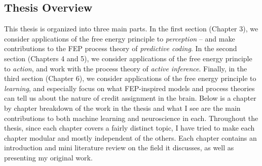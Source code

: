 \subsection{Thesis Overview}

This thesis is organized into three main parts. In the first section (Chapter 3), we consider applications of the free energy principle to \emph{perception} -- and make contributions to the FEP process theory of \emph{predictive coding}. In the second section (Chapters 4 and 5), we consider applications of the free energy principle to \emph{action}, and work with the process theory of \emph{active inference}. Finally, in the third section (Chapter 6), we consider applications of the free energy principle to \emph{learning}, and especially focus on what FEP-inspired models and process theories can tell us about the nature of credit assignment in the brain. Below is a chapter by chapter breakdown of the work in the thesis and what I see are the main contributions to both machine learning and neuroscience in each. Throughout the thesis, since each chapter covers a fairly distinct topic, I have tried to make each chapter modular and mostly independent of the others. Each chapter contains an introduction and mini literature review on the field it discusses, as well as presenting my original work.




